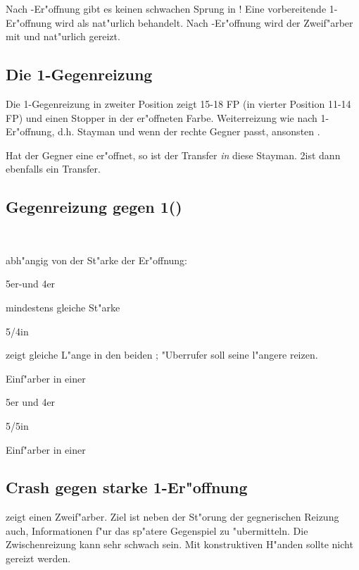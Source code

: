 Nach \ofa-Er"offnung gibt es keinen schwachen Sprung in \tr! Eine
vorbereitende 1\tre-Er"offnung wird als nat"urlich behandelt.
Nach \ufa-Er"offnung wird der Zweif"arber mit \pi und \aufa nat"urlich gereizt.

\subsection{Die 1\SA-Gegenreizung}

Die 1\SA-Gegenreizung in zweiter Position zeigt 15-18 FP (in vierter Position
11-14 FP) und einen
Stopper in der er"offneten Farbe. Weiterreizung wie nach
1\SA-Er"offnung, d.h. Stayman und  wenn der
rechte Gegner passt, ansonsten .

Hat der Gegner eine \ofa er"offnet, so ist der Transfer \emph{in} diese \ofa
Stayman. 2\tre ist dann ebenfalls ein Transfer.

\subsection{Gegenreizung gegen 1\SA ()}

\bdsc
\item[(1\SA){}\sep?] ~
 \bdsc
 \item[\kontra] abh"angig von der St"arke der Er"offnung:
   \bdsc
     \item[starker \sa] 5\pl{}er-\ufa und 4er \ofa
     \item[schwacher \sa] mindestens gleiche St"arke
   \edsc
 \item[2\tre] 5\pl/4\pl in \ofa
  \bdsc
  \item[2\kar] zeigt gleiche L"ange in den beiden \ofa; "Uberrufer soll
    seine l"angere \ofa reizen.
  \edsc
 \item[2\kar] Einf"arber in einer \ofa
 \item[2\of] 5\pl{}er \ofa und 4er \ufa
 \item[2\SA] 5/5\pl in \ufa
 \item[3\uf] Einf"arber in einer \ufa
 \edsc
\edsc

\subsection{Crash gegen starke 1\tre-Er"offnung}

 zeigt einen Zweif"arber. Ziel ist neben der St"orung der
gegnerischen Reizung auch, Informationen f"ur das sp"atere Gegenspiel
zu "ubermitteln.  Die Zwischenreizung kann sehr schwach sein.  Mit
konstruktiven H"anden sollte  nicht gereizt werden.

